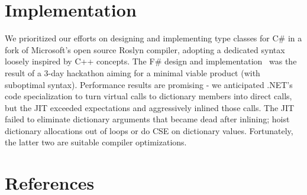 \documentclass{elsarticle}
\begin{document}
\section{Implementation}
 
We prioritized our efforts on designing and implementing type classes for C\# in a fork\cite{Roslynfork}  of  Microsoft's open source Roslyn compiler\cite{Roslyn}, adopting a dedicated syntax loosely inspired  by C++ concepts\cite{cppconcepts}.
The F\# design and implementation~\cite{fshack} was the result of a 3-day hackathon aiming for a minimal viable product (with suboptimal syntax).
Performance results are promising - we anticipated  .NET's code specialization to turn virtual calls to dictionary members into direct calls, but the JIT exceeded expectations and aggressively inlined those calls. 
The JIT failed to eliminate  dictionary arguments that became dead after inlining; hoist dictionary allocations out of loops or do CSE on dictionary values. Fortunately, the latter two are suitable compiler optimizations.

\newcommand{\tightlist}{}
\newcommand{\sout}[1]{{#1}}


\section*{References}



 
\end{document}
